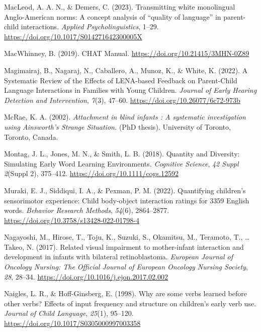 \documentclass[
  man,floatsintext]{apa6}
\newlength{\cslhangindent}
\newlength{\cslentryspacingunit} %
\newenvironment{CSLReferences}[2] %
 {%
  \setlength{\parindent}{0pt}
  \ifodd #1
  \let\oldpar\par
  \def\par{\hangindent=\cslhangindent\oldpar}
  \fi
  \setlength{\parskip}{#2\cslentryspacingunit}
 }%
 {}
\begin{document}
\begin{CSLReferences}{1}{0}
\leavevmode{}%
MacLeod, A. A. N., \& Demers, C. (2023). Transmitting white monolingual {Anglo-American} norms: {A} concept analysis of {``quality of language''} in parent-child interactions. \emph{Applied Psycholinguistics}, 1--29. \url{https://doi.org/10.1017/S014271642300005X}

\leavevmode{}%
MacWhinney, B. (2019). {CHAT Manual}. \url{https://doi.org/10.21415/3MHN-0Z89}

\leavevmode{}%
Magimairaj, B., Nagaraj, N., Caballero, A., Munoz, K., \& White, K. (2022). A {Systematic Review} of the {Effects} of {LENA-based Feedback} on {Parent-Child Language Interactions} in {Families} with {Young Children}. \emph{Journal of Early Hearing Detection and Intervention}, \emph{7}(3), 47--60. \url{https://doi.org/10.26077/6c72-973b}

\leavevmode{}%
McRae, K. A. (2002). \emph{Attachment in blind infants : A systematic investigation using {Ainsworth}'s {Strange Situation}.} (PhD thesis). University of Toronto, {Toronto, Canada}.

\leavevmode{}%
Montag, J. L., Jones, M. N., \& Smith, L. B. (2018). Quantity and {Diversity}: {Simulating Early Word Learning Environments}. \emph{Cognitive Science}, \emph{42 Suppl 2}(Suppl 2), 375--412. \url{https://doi.org/10.1111/cogs.12592}

\leavevmode{}%
Muraki, E. J., Siddiqui, I. A., \& Pexman, P. M. (2022). Quantifying children's sensorimotor experience: {Child} body-object interaction ratings for 3359 {English} words. \emph{Behavior Research Methods}, \emph{54}(6), 2864--2877. \url{https://doi.org/10.3758/s13428-022-01798-4}

\leavevmode{}%
Nagayoshi, M., Hirose, T., Toju, K., Suzuki, S., Okamitsu, M., Teramoto, T., \ldots{} Takeo, N. (2017). Related visual impairment to mother-infant interaction and development in infants with bilateral retinoblastoma. \emph{European Journal of Oncology Nursing: The Official Journal of European Oncology Nursing Society}, \emph{28}, 28--34. \url{https://doi.org/10.1016/j.ejon.2017.02.002}

\leavevmode{}%
Naigles, L. R., \& Hoff-Ginsberg, E. (1998). Why are some verbs learned before other verbs? {Effects} of input frequency and structure on children's early verb use. \emph{Journal of Child Language}, \emph{25}(1), 95--120. \url{https://doi.org/10.1017/S0305000997003358}


\end{CSLReferences}
\end{document}
